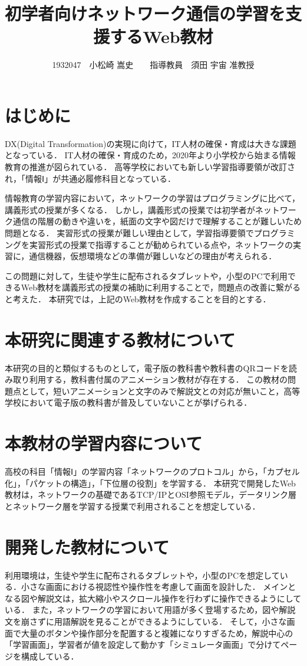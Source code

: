 \documentclass[twocolumn,10pt,a4j]{ltjsarticle}
\title{初学者向けネットワーク通信の学習を支援するWeb教材}
\author{1932047　小松崎 嵩史　　指導教員　須田 宇宙 准教授}
\date{}
\begin{document}
\maketitle

\section{はじめに}

DX(Digital Transformation)の実現に向けて，IT人材の確保・育成は大きな課題となっている\cite{dx}．
IT人材の確保・育成のため，2020年より小学校から始まる情報教育の推進が図られている．
高等学校においても新しい学習指導要領が改訂され，「情報Ⅰ」が共通必履修科目となっている．


情報教育の学習内容において，ネットワークの学習はプログラミングに比べて，講義形式の授業が多くなる．
しかし，講義形式の授業では初学者がネットワーク通信の階層の動きや違いを，紙面の文字や図だけで理解することが難しいため問題となる．
実習形式の授業が難しい理由として，学習指導要領でプログラミングを実習形式の授業で指導することが勧められている点や，ネットワークの実習に，通信機器，仮想環境などの準備が難しいなどの理由が考えられる．

この問題に対して，生徒や学生に配布されるタブレットや，小型のPCで利用できるWeb教材を講義形式の授業の補助に利用することで，問題点の改善に繋がると考えた．
本研究では，上記のWeb教材を作成することを目的とする．

\section{本研究に関連する教材について}
本研究の目的と類似するものとして，電子版の教科書や教科書のQRコードを読み取り利用する，教科書付属のアニメーション教材が存在する．
この教材の問題点として，短いアニメーションと文字のみで解説文との対応が無いこと，高等学校において電子版の教科書が普及していないことが挙げられる．

\section{本教材の学習内容について}
高校の科目「情報Ⅰ」の学習内容「ネットワークのプロトコル」から，「カプセル化」，「パケットの構造」，「下位層の役割」を学習する．
本研究で開発したWeb教材は，ネットワークの基礎であるTCP/IPとOSI参照モデル，データリンク層とネットワーク層を学習する授業で利用されることを想定している．

\section{開発した教材について}
利用環境は，生徒や学生に配布されるタブレットや，小型のPCを想定している．小さな画面における視認性や操作性を考慮して画面を設計した．
メインとなる図や解説文は，拡大縮小やスクロール操作を行わずに操作できるようにしている．
また，ネットワークの学習において用語が多く登場するため，図や解説文を崩さずに用語解説を見ることができるようにしている．
そして，小さな画面で大量のボタンや操作部分を配置すると複雑になりすぎるため，解説中心の「学習画面」，学習者が値を設定して動かす「シミュレータ画面」で分けてページを構成している．
\end{document}
